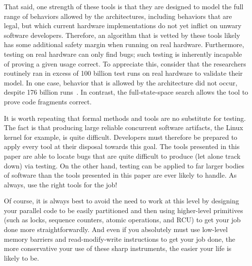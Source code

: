That said, one strength of these tools is that they are designed to
model the full range of behaviors allowed by the architectures, including
behaviors that are legal, but which current hardware implementations do
not yet inflict on unwary software developers. Therefore, an algorithm
that is vetted by these tools likely has some additional safety margin
when running on real hardware. Furthermore, testing on real hardware can
only find bugs; such testing is inherently incapable of proving a given
usage correct. To appreciate this, consider that the researchers
routinely ran in excess of 100 billion test runs on real hardware to
validate their model.
In one case, behavior that is allowed by the architecture did not occur,
despite 176 billion runs~\cite{JadeAlglave2011ppcmem}.
In contrast, the
full-state-space search allows the tool to prove code fragments correct.

It is worth repeating that formal methods and tools are no substitute for
testing. The fact is that producing large reliable concurrent software
artifacts, the Linux kernel for example, is quite difficult. Developers
must therefore be prepared to apply every tool at their disposal towards
this goal. The tools presented in this paper are able to locate bugs that
are quite difficult to produce (let alone track down) via testing. On the
other hand, testing can be applied to far larger bodies of software than
the tools presented in this paper are ever likely to handle. As always,
use the right tools for the job!

Of course, it is always best to avoid the need to work at this level
by designing your parallel code to be easily partitioned and then
using higher-level primitives (such as locks, sequence counters, atomic
operations, and RCU) to get your job done more straightforwardly. And even
if you absolutely must use low-level memory barriers and read-modify-write
instructions to get your job done, the more conservative your use of
these sharp instruments, the easier your life is likely to be.
